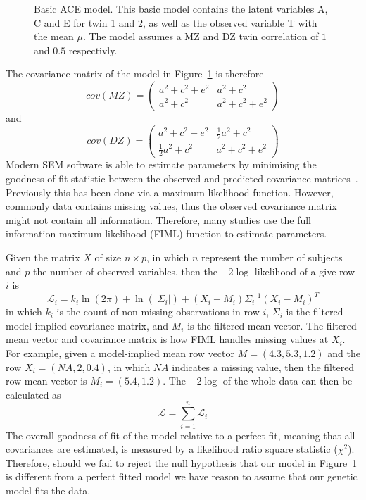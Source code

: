 \begin{figure}[htpb]
  \centering
  \scalebox{0.6}{}
  \caption[ACE Model]{Basic ACE model.
    This basic model contains the latent variables A, C and E for twin 1 and 2, as well as the observed variable T with the mean $\mu$.
    The model assumes a MZ and DZ twin correlation of $1$ and $0.5$ respectivly.
  }\label{fig:ace}
\end{figure}

The covariance matrix of the model in Figure~\ref{fig:ace} is therefore
\begin{equation}
  cov(MZ) = 
  \begin{pmatrix}
    a^2 + c^2 + e^2 & a^2 + c^2 \\
    a^2 + c^2 & a^2 + c^2 + e^2
  \end{pmatrix}
\end{equation}
and 
\begin{equation}
  cov(DZ) = 
  \begin{pmatrix}
    a^2 + c^2 + e^2 & \frac{1}{2}a^2 + c^2 \\
    \frac{1}{2}a^2 + c^2 & a^2 + c^2 + e^2
  \end{pmatrix}
\end{equation}
Modern SEM software is able to estimate parameters by minimising the goodness-of-fit statistic between the observed and predicted covariance matrices~\cite{Boker2011}.
Previously this has been done via a maximum-likelihood function.
However, commonly data contains missing values, thus the observed covariance matrix might not contain all information.
Therefore, many studies use the full information maximum-likelihood (FIML) function to estimate parameters.

Given the matrix $X$ of size $n\times p$, in which $n$ represent the number of subjects and $p$ the number of observed variables, then the $-2\log$ likelihood of a give row $i$ is
\begin{equation}\label{eq:fiml}
  \mathcal{L}_i = k_i \ln(2\pi) + \ln(|\Sigma_i|) + (X_i-M_i)\Sigma_i^{-1}(X_i-M_i)^{T} 
\end{equation}
in which $k_i$ is the count of non-missing observations in row $i$, $\Sigma_i$ is the filtered model-implied covariance matrix, and $M_i$ is the filtered mean vector.
The filtered mean vector and covariance matrix is how FIML handles missing values at $X_i$.
For example, given a model-implied mean row vector $M=(4.3, 5.3, 1.2)$ and the row $X_i=(NA, 2, 0.4)$, in which $NA$ indicates a missing value, then the filtered row mean vector is $M_i = (5.4, 1.2)$. 
The $-2\log$ of the whole data can then be calculated as
\begin{equation}
  \mathcal{L} = \sum^n_{i=1} \mathcal{L}_i
\end{equation}
The overall goodness-of-fit of the model relative to a perfect fit, meaning that all covariances are estimated, is measured by a likelihood ratio square statistic ($\chi^2$).
Therefore, should we fail to reject the null hypothesis that our model in Figure~\ref{fig:ace} is different from a perfect fitted model we have reason to assume that our genetic model fits the data.

